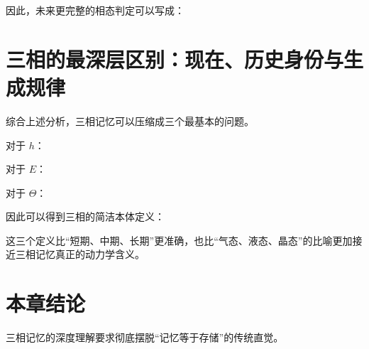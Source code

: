 因此，未来更完整的相态判定可以写成：
\begin{statementbox}
\centering
{}
\end{statementbox}

\section{三相的最深层区别：现在、历史身份与生成规律}

综合上述分析，三相记忆可以压缩成三个最基本的问题。

对于 $h$：
\begin{statementbox}
\centering
{}
\end{statementbox}

对于 $E$：
\begin{statementbox}
\centering
{}
\end{statementbox}

对于 $\Theta$：
\begin{statementbox}
\centering
{}
\end{statementbox}

因此可以得到三相的简洁本体定义：
\begin{statementbox}
\centering
{}
\end{statementbox}
\begin{statementbox}
\centering
{}
\end{statementbox}
\begin{statementbox}
\centering
{}
\end{statementbox}

这三个定义比“短期、中期、长期”更准确，也比“气态、液态、晶态”的比喻更加接近三相记忆真正的动力学含义。

\section{本章结论}

三相记忆的深度理解要求彻底摆脱“记忆等于存储”的传统直觉。

